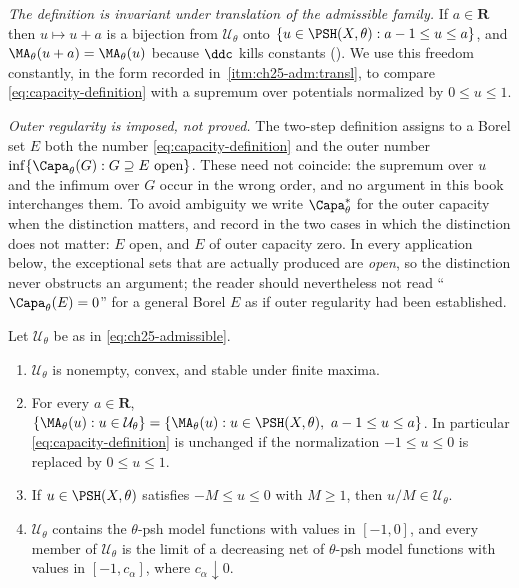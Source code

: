 \emph{The definition is invariant under translation of the admissible
family.}  If \(a\in\mathbf R\) then \(u\mapsto u+a\) is a bijection from
\(\mathcal U_\theta\) onto \(\{u\in\PSH(X,\theta):a-1\leq u\leq a\}\), and
\(\MA_\theta(u+a)=\MA_\theta(u)\) because \(\ddc\) kills constants
().  We use this freedom constantly, in the form recorded
in \,\cref{itm:ch25-adm:transl}, to compare
\eqref{eq:capacity-definition} with a supremum over potentials normalized by
\(0\leq u\leq1\).

\emph{Outer regularity is imposed, not proved.}  The two-step definition
assigns to a Borel set \(E\) both the number \eqref{eq:capacity-definition}
and the outer number \(\inf\{\Capa_\theta(G):G\supseteq E\ \text{open}\}\).
These need not coincide: the supremum over \(u\) and the infimum over \(G\)
occur in the wrong order, and no argument in this book interchanges them.  To
avoid ambiguity we write \(\Capa_\theta^*\) for the outer capacity when the
distinction matters, and record in  the two cases
in which the distinction does not matter: \(E\) open, and \(E\) of outer
capacity zero.  In every application below, the exceptional sets that are
actually produced are \emph{open}, so the distinction never obstructs an
argument; the reader should nevertheless not read
``\(\Capa_\theta(E)=0\)'' for a general Borel \(E\) as if outer regularity
had been established.

\begin{lemma}
\label{lem:ch25-admissible-calculus}
Let \(\mathcal U_\theta\) be as in \eqref{eq:ch25-admissible}.
\begin{enumerate}
\item\label{itm:ch25-adm:nonempty}
 \(\mathcal U_\theta\) is nonempty, convex, and stable under finite maxima.
\item\label{itm:ch25-adm:transl}
 For every \(a\in\mathbf R\),
 \(\{\MA_\theta(u):u\in\mathcal U_\theta\}
   =\{\MA_\theta(u):u\in\PSH(X,\theta),\ a-1\leq u\leq a\}\).
 In particular \eqref{eq:capacity-definition} is unchanged if the
 normalization \(-1\leq u\leq0\) is replaced by \(0\leq u\leq1\).
\item\label{itm:ch25-adm:scale}
 If \(u\in\PSH(X,\theta)\) satisfies \(-M\leq u\leq0\) with \(M\geq1\), then
 \(u/M\in\mathcal U_\theta\).
\item\label{itm:ch25-adm:model}
 \(\mathcal U_\theta\) contains the \(\theta\)-psh model functions with
 values in \([-1,0]\), and every member of \(\mathcal U_\theta\) is the limit
 of a decreasing net of \(\theta\)-psh model functions with values in
 \([-1,c_\alpha]\), where \(c_\alpha\downarrow0\).
\end{enumerate}
\end{lemma}


